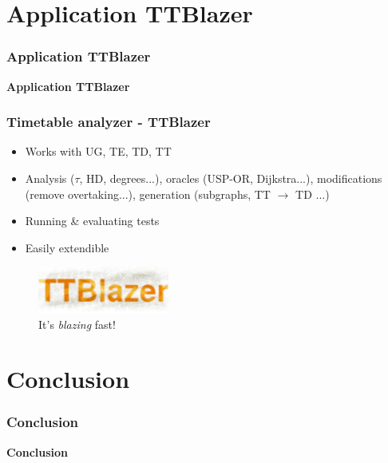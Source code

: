 \documentclass[]{beamer}
\begin{document}
    \section{Application TTBlazer}
    \begin{frame}
        \frametitle{Application TTBlazer}
        \begin{center}
            \textcolor{red!80!black}{\textbf{Application TTBlazer}}
        \end{center}
    \end{frame}
       
        \begin{frame}
            \frametitle{Timetable analyzer - TTBlazer}
			\begin{itemize}
				\item Works with UG, TE, TD, TT
				\item Analysis ($\tau$, HD, degrees...), oracles (USP-OR, Dijkstra...), modifications (remove overtaking...), generation (subgraphs, TT $\rightarrow$ TD ...)
				\item Running \& evaluating tests
				\item Easily extendible
			\end{itemize}
			\begin{figure}[h!]
                \includegraphics[height=0.6in]{ttblazer.png}
                \caption{It's \textit{blazing} fast!}
            \end{figure}
        \end{frame}	
    
    \section{Conclusion}
    \begin{frame}
        \frametitle{Conclusion}
        \begin{center}
            \textcolor{red!80!black}{\textbf{Conclusion}}
        \end{center}
    \end{frame}
    
\end{document}
